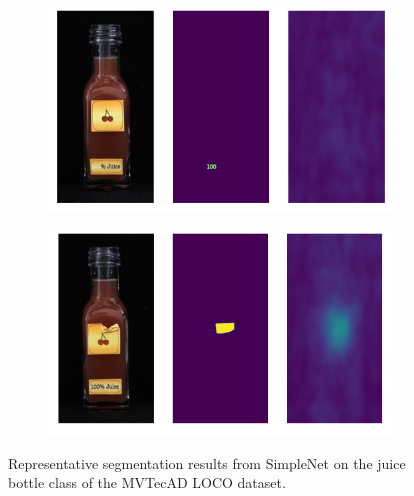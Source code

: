 \begin{figure}[htbp]
\begin{subfigure}[b]{0.3\textwidth}
    \end{subfigure}
    \begin{subfigure}[b]{0.3\textwidth}
        \centering
        \includegraphics[width=\textwidth]{figures/locosimplenetresults/JB/image_prediction_297.png}

    \end{subfigure}
    \begin{subfigure}[b]{0.3\textwidth}
        \centering
        \includegraphics[width=\textwidth]{figures/locosimplenetresults/JB/image_prediction_300.png}

    \end{subfigure}
    \caption{Representative segmentation results from SimpleNet \cite{liu2023simplenet} on the juice bottle class of the MVTecAD LOCO \cite{LOCODentsAndScratchesBergmann2022} dataset.}
    \label{fig:SNJB}
\end{figure}